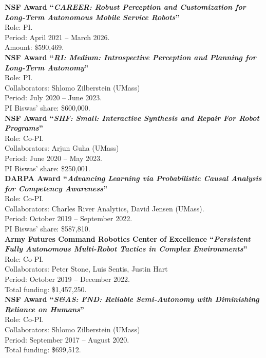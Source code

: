 \documentclass[Times]{article}
\newcommand{\funding}[1]{#1\\}
\begin{document}
\textbf{NSF Award ``\emph{CAREER: Robust Perception and Customization for Long-Term Autonomous Mobile Service Robots}''}\\
Role: PI.\\
Period: April 2021 -- March 2026.\\
\funding{Amount: \$590,469.}

\textbf{NSF Award ``\emph{RI: Medium: Introspective Perception and Planning for Long-Term Autonomy}''}\\
Role: PI.\\
Collaborators: Shlomo Zilberstein (UMass)\\
Period: July 2020 -- June 2023.\\
\funding{PI Biswas' share: \$600,000.}

\textbf{NSF Award ``\emph{SHF: Small: Interactive Synthesis and Repair For Robot Programs}''}\\
Role: Co-PI.\\
Collaborators: Arjun Guha (UMass)\\
Period: June 2020 -- May 2023.\\
\funding{PI Biswas' share: \$250,001.}

\textbf{DARPA Award ``\emph{Advancing Learning via Probabilistic Causal Analysis for Competency Awareness}''}\\
Role: Co-PI.\\
Collaborators: Charles River Analytics, David Jensen (UMass).\\
Period: October 2019 -- September 2022.\\
\funding{PI Biswas' share: \$587,810.}

\textbf{Army Futures Command Robotics Center of Excellence ``\emph{Persistent Fully Autonomous Multi-Robot Tactics in Complex Environments}''}\\
Role: Co-PI.\\
Collaborators: Peter Stone, Luis Sentis, Justin Hart\\
Period: October 2019 -- December 2022.\\
\funding{Total funding: \$1,457,250.}

\textbf{NSF Award ``\emph{S\&AS: FND: Reliable Semi-Autonomy with Diminishing Reliance
on Humans}''}\\
Role: Co-PI.\\
Collaborators: Shlomo Zilberstein (UMass)\\
Period: September 2017 -- August 2020.\\
\funding{Total funding: \$699,512.}
\end{document}

